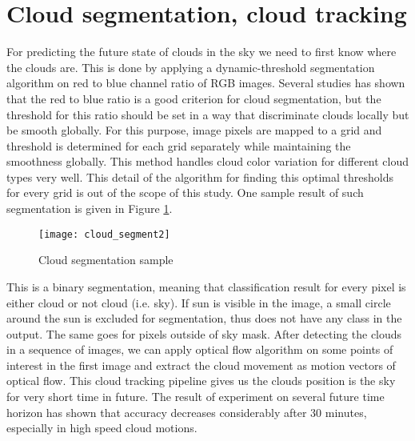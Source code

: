 
\section{Cloud segmentation, cloud tracking}
For predicting the future state of clouds in the sky we need to first know where the clouds are. This is done by applying a dynamic-threshold segmentation algorithm on red to blue channel ratio of RGB images. Several studies has shown that the red to blue ratio is a good criterion for cloud segmentation, but the threshold for this ratio should be set in a way that discriminate clouds locally but be smooth globally. For this purpose, image pixels are mapped to a grid and threshold is determined for each grid separately while maintaining the smoothness globally. This method handles cloud color variation for different cloud types very well. This detail of the algorithm for finding this optimal thresholds for every grid is out of the scope of this study. One sample result of such segmentation is given in Figure \ref{fig:cloud_seg}.
\begin{figure}[h]
\caption{Cloud segmentation sample}
\label{fig:cloud_seg}
\texttt{[image: cloud\_segment2]}
\centering
\end{figure}

This is a binary segmentation, meaning that classification result for every pixel is either cloud or not cloud (i.e. sky). If sun is visible in the image, a small circle around the sun is excluded for segmentation, thus does not have any class in the output. The same goes for pixels outside of sky mask. After detecting the clouds in a sequence of images, we can apply optical flow algorithm on some points of interest in the first image and extract the cloud movement as motion vectors of optical flow. This cloud tracking pipeline gives us the clouds position is the sky for very short time in future. The result of experiment on several future time horizon has shown that accuracy decreases considerably after 30 minutes, especially in high speed cloud motions.

